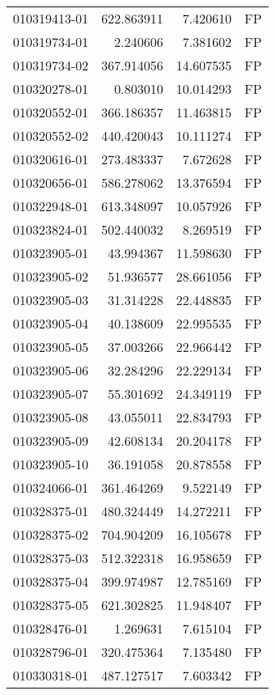 \begin{tabular}{lrrl}
010319413-01 &  622.863911 &     7.420610 &   FP \\
010319734-01 &    2.240606 &     7.381602 &   FP \\
010319734-02 &  367.914056 &    14.607535 &   FP \\
010320278-01 &    0.803010 &    10.014293 &   FP \\
010320552-01 &  366.186357 &    11.463815 &   FP \\
010320552-02 &  440.420043 &    10.111274 &   FP \\
010320616-01 &  273.483337 &     7.672628 &   FP \\
010320656-01 &  586.278062 &    13.376594 &   FP \\
010322948-01 &  613.348097 &    10.057926 &   FP \\
010323824-01 &  502.440032 &     8.269519 &   FP \\
010323905-01 &   43.994367 &    11.598630 &   FP \\
010323905-02 &   51.936577 &    28.661056 &   FP \\
010323905-03 &   31.314228 &    22.448835 &   FP \\
010323905-04 &   40.138609 &    22.995535 &   FP \\
010323905-05 &   37.003266 &    22.966442 &   FP \\
010323905-06 &   32.284296 &    22.229134 &   FP \\
010323905-07 &   55.301692 &    24.349119 &   FP \\
010323905-08 &   43.055011 &    22.834793 &   FP \\
010323905-09 &   42.608134 &    20.204178 &   FP \\
010323905-10 &   36.191058 &    20.878558 &   FP \\
010324066-01 &  361.464269 &     9.522149 &   FP \\
010328375-01 &  480.324449 &    14.272211 &   FP \\
010328375-02 &  704.904209 &    16.105678 &   FP \\
010328375-03 &  512.322318 &    16.958659 &   FP \\
010328375-04 &  399.974987 &    12.785169 &   FP \\
010328375-05 &  621.302825 &    11.948407 &   FP \\
010328476-01 &    1.269631 &     7.615104 &   FP \\
010328796-01 &  320.475364 &     7.135480 &   FP \\
010330318-01 &  487.127517 &     7.603342 &   FP \\

\end{tabular}
